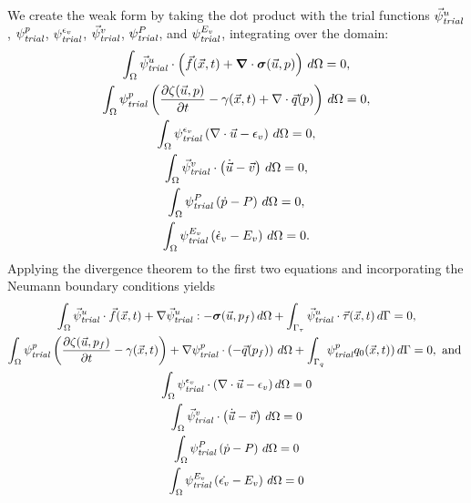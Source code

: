 %
We create the weak form by taking the dot product with the trial
functions $\trialvec[u]$, $\trialscalar[p]$, $\trialscalar[\epsilon_{v}]$, $\trialvec[v]$, $\trialscalar[P]$, and $\trialscalar[E_{v}]$,
integrating over the domain:
\begin{gather}
    \int_\Omega \trialvec[u] \cdot \left( \vec{f}(\vec{x},t) + \tensor{\nabla} \cdot \tensor{\sigma} (\vec{u},p) \right) \, d\Omega = 0, \\
    \int_\Omega  \trialscalar[p] \left( \frac{\partial \zeta(\vec{u},p)}{\partial t} - \gamma(\vec{x},t) + \nabla \cdot \vec{q}(p)\right) \, d\Omega = 0,\\
    \int_{\Omega} \trialscalar[\epsilon_{v}] \left( \nabla \cdot \vec{u} - \epsilon_v \right) \, d\Omega = 0, \\
    \int_{\Omega} \trialvec[v] \cdot \left(\dot{\vec{u}} - \vec{v} \right) \, d\Omega = 0, \\
    \int_{\Omega} \trialscalar[P] \left( \dot{p} - P \right) \, d\Omega = 0, \\
    \int_{\Omega} \trialscalar[E_{v}] \left( \dot{\epsilon}_{v} - E_{v} \right) \, d\Omega = 0.
\end{gather}
%
Applying the divergence theorem to the first two equations and
incorporating the Neumann boundary conditions yields
\begin{gather}
    \int_\Omega \trialvec[u] \cdot \vec{f}(\vec{x},t) + \nabla \trialvec[u] : -\tensor{\sigma}(\vec{u},p_f) \,
    d\Omega + \int_{\Gamma_\tau} \trialvec[u] \cdot \vec{\tau}(\vec{x},t) \, d\Gamma = 0, \\
    \int_\Omega  \trialscalar[p] \left( \frac{\partial \zeta(\vec{u},p_f)}{\partial t} - \gamma(\vec{x},t)\right)
    + \nabla \trialscalar[p] \cdot \left(-\vec{q}(p_f)\right) \, d\Omega + \int_{\Gamma_q} \trialscalar[p] q_0(\vec{x},t))\, d\Gamma = 0, \text{ and } \\
    \int_{\Omega} \trialscalar[\epsilon_{v}] \cdot \left(\nabla \cdot \vec{u} - \epsilon_{v} \right) d\Omega = 0 \\
    \int_{\Omega} \trialvec[v] \cdot \left(\dot{\vec{u}} - \vec{v} \right) \, d\Omega = 0 \\
    \int_{\Omega} \trialscalar[P] \left(  \dot{p} - P \right) \, d\Omega = 0 \\
    \int_{\Omega} \trialscalar[E_{v}] \left( \dot{\epsilon_{v}} - E_{v} \right) \, d\Omega = 0
\end{gather}

